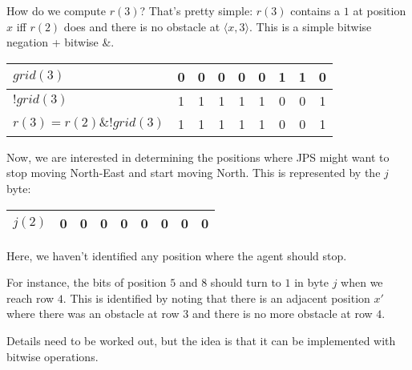 \documentclass{article}
\begin{document}
How do we compute $r(3)$?  
That's pretty simple: $r(3)$ contains a $1$ at position $x$ 
iff $r(2)$ does and there is no obstacle at $\langle x,3\rangle$.  
This is a simple bitwise negation + bitwise \&.  
\begin{center}
  \begin{tabular}{|l|c|c|c|c|c|c|c|c|}
    \hline
    $grid(3)$  & 0 & 0 & 0 & 0 & 0 & 1 & 1 & 0 \\
    \hline
    $!grid(3)$ & 1 & 1 & 1 & 1 & 1 & 0 & 0 & 1 \\
    \hline
    $r(3) = r(2) \& !grid(3)$ & 1 & 1 & 1 & 1 & 1 & 0 & 0 & 1 \\
    \hline
  \end{tabular}
\end{center}

Now, we are interested in determining the positions 
where JPS might want to stop moving North-East and start moving North.  
This is represented by the $j$ byte: 
\begin{center}
  \begin{tabular}{|l|c|c|c|c|c|c|c|c|}
    \hline
    $j(2)$ & 0 & 0 & 0 & 0 & 0 & 0 & 0 & 0 \\
    \hline
  \end{tabular}
\end{center}
Here, we haven't identified any position 
where the agent should stop.  

For instance, the bits of position $5$ and $8$ 
should turn to $1$ in byte $j$ when we reach row $4$.  
This is identified by noting 
that there is an adjacent position $x'$ 
where there was an obstacle at row $3$ 
and there is no more obstacle at row $4$.  

Details need to be worked out, 
but the idea is that it can be implemented with bitwise operations.  

%


\end{document}
